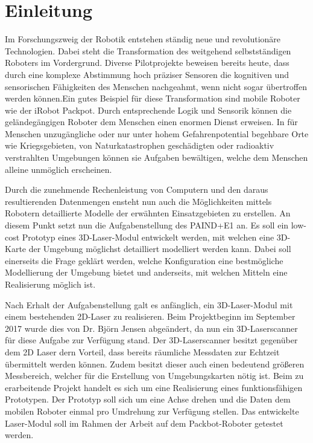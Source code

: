 
\chapter*{Einleitung}

Im Forschungszweig der Robotik entstehen ständig neue und revolutionäre Technologien. Dabei steht die Transformation des weitgehend selbstständigen Roboters im Vordergrund. Diverse Pilotprojekte beweisen bereits heute, dass durch eine komplexe Abstimmung hoch präziser Sensoren die kognitiven und sensorischen Fähigkeiten des Menschen nachgeahmt, wenn nicht sogar übertroffen werden können.Ein gutes Beispiel für diese Transformation sind mobile Roboter wie der iRobot Packpot. Durch entsprechende Logik und Sensorik können die geländegängigen Roboter dem Menschen einen enormen Dienst erweisen. In für Menschen unzugängliche oder nur unter hohem Gefahrenpotential begehbare Orte wie Kriegsgebieten, von Naturkatastrophen geschädigten oder radioaktiv verstrahlten Umgebungen können sie Aufgaben bewältigen, welche dem Menschen alleine unmöglich erscheinen.

Durch die zunehmende Rechenleistung von Computern und den daraus resultierenden Datenmengen ensteht nun auch die Möglichkeiten mittels Robotern detaillierte Modelle der erwähnten Einsatzgebieten zu erstellen. An diesem Punkt setzt nun die Aufgabenstellung des PAIND+E1 an. Es soll ein low-cost Prototyp eines 3D-Laser-Modul entwickelt werden, mit welchen eine 3D-Karte der Umgebung möglichst detailliert modelliert werden kann. Dabei soll einerseits die Frage geklärt werden, welche Konfiguration eine bestmögliche Modellierung der Umgebung bietet und anderseits, mit welchen Mitteln eine Realisierung möglich ist.

Nach Erhalt der Aufgabenstellung galt es anfänglich, ein 3D-Laser-Modul mit einem bestehenden 2D-Laser zu realisieren. Beim Projektbeginn im September 2017 wurde dies von Dr. Björn Jensen abgeändert, da nun ein 3D-Laserscanner für diese Aufgabe zur Verfügung stand. Der 3D-Laserscanner besitzt gegenüber dem 2D Laser dern Vorteil, dass bereits räumliche Messdaten zur Echtzeit übermittelt werden können. Zudem besitzt dieser auch einen bedeutend größeren Messbereich, welcher für die Erstellung von Umgebungskarten nötig ist. Beim zu erarbeitende Projekt handelt es sich um eine Realisierung eines funktionsfähigen Prototypen. Der Prototyp soll sich um eine Achse drehen und die Daten dem mobilen Roboter einmal pro Umdrehung zur Verfügung stellen. Das entwickelte Laser-Modul soll im Rahmen der Arbeit auf dem Packbot-Roboter getestet werden.


